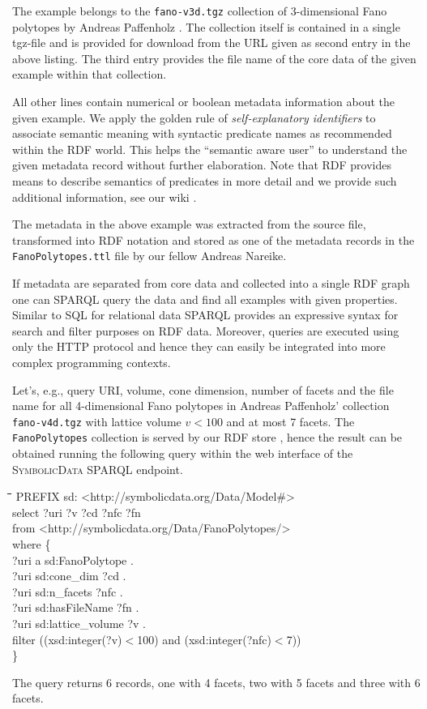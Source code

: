 \documentclass{mathincs}
\newcommand{\SD}{\textsc{Symbo\-lic\-Data}}
\newenvironment{code}{\par\tt\begin{tabbing}
\hskip12pt\=\hskip12pt\=\hskip12pt\=\hskip12pt\=\hskip5cm\=\hskip5cm\=\kill}
{\end{tabbing}\normalsize}
\begin{document}
The example belongs to the \texttt{fano-v3d.tgz} collection of 3-dimensional
Fano polytopes by Andreas Paffenholz \cite{fano}. The collection itself is
contained in a single tgz-file and is provided for download from the URL given
as second entry in the above listing.  The third entry provides the file name
of the core data of the given example within that collection.

All other lines contain numerical or boolean metadata information about the
given example.  We apply the golden rule of \emph{self-explanatory identifiers}
to associate semantic meaning with syntactic predicate names as recommended
within the RDF world.  This helps the ``semantic aware user'' to understand the
given metadata record without further elaboration. Note that RDF provides means
to describe semantics of predicates in more detail and we provide such
additional information, see our wiki \cite{sdwiki}.

The metadata in the above example was extracted from the source file,
transformed into RDF notation and stored as one of the metadata records in the
\texttt{FanoPolytopes.ttl} file by our fellow Andreas Nareike.

If metadata are separated from core data and collected into a single RDF graph
one can SPARQL query the data and find all examples with given properties.
Similar to SQL for relational data SPARQL provides an expressive syntax for
search and filter purposes on RDF data. Moreover, queries are executed using
only the HTTP protocol and hence they can easily be integrated into more
complex programming contexts.

Let's, e.g., query URI, volume, cone dimension, number of facets and the file
name for all 4-dimensional Fano polytopes in Andreas Paffenholz' collection
\texttt{fano-v4d.tgz} with lattice volume $v<100$ and at most 7 facets.  The
\texttt{FanoPolytopes} collection is served by our RDF store \cite{sdstore},
hence the result can be obtained running the following query within the web
interface \cite{sdsparql} of the {\SD} SPARQL endpoint.
\begin{code}
  PREFIX sd: <http://symbolicdata.org/Data/Model\#> \\
  select ?uri ?v ?cd ?nfc ?fn\\
  from <http://symbolicdata.org/Data/FanoPolytopes/>\\
  where \{\+\\
  ?uri a sd:FanoPolytope .\\
  ?uri sd:cone\_dim ?cd .\\
  ?uri sd:n\_facets ?nfc .\\
  ?uri sd:hasFileName ?fn . \\
  ?uri sd:lattice\_volume ?v . \\
  filter ((xsd:integer(?v)$<$100) and (xsd:integer(?nfc)$<$7))\-\\
  \}
\end{code}
The query returns 6 records, one with 4 facets, two with 5 facets and three
with 6 facets. 
\end{document}
